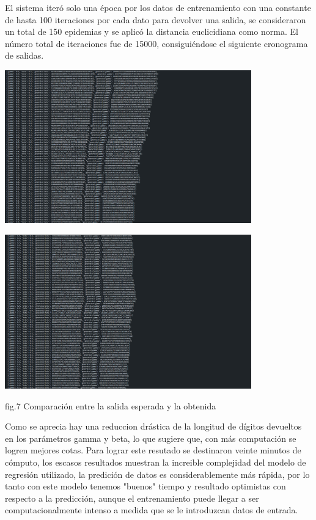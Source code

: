     El sistema iteró solo una época por los datos de entrenamiento con una constante de hasta 100 iteraciones por cada dato para devolver una salida, se consideraron
    un total de 150 epidemias y se aplicó la distancia euclicidiana como norma. El número total de iteraciones fue de 15000, consiguiéndose el siguiente cronograma de salidas.

    \begin{center}
        
        \includegraphics[width=0.8\textwidth]{images/1.png}

        \includegraphics[width=0.8\textwidth]{images/2.png}
        
        \begin{center}
            fig.7 Comparación entre la salida esperada y la obtenida
        \end{center} 

\end{center}

Como se aprecia hay una reduccion drástica de la longitud de dígitos devueltos en los parámetros gamma y beta, lo que sugiere que, con más computación se logren 
mejores cotas. Para lograr este resutado se destinaron veinte minutos de cómputo, los escasos resultados muestran la increible 
complejidad del modelo de regresión utilizado, la predición de datos es considerablemente más rápida, por lo tanto con este modelo tenemos "buenos" tiempo 
y resultado optimistas con respecto a la predicción, aunque el entrenamiento puede llegar a ser computacionalmente intenso a medida que se le introduzcan datos de entrada.

